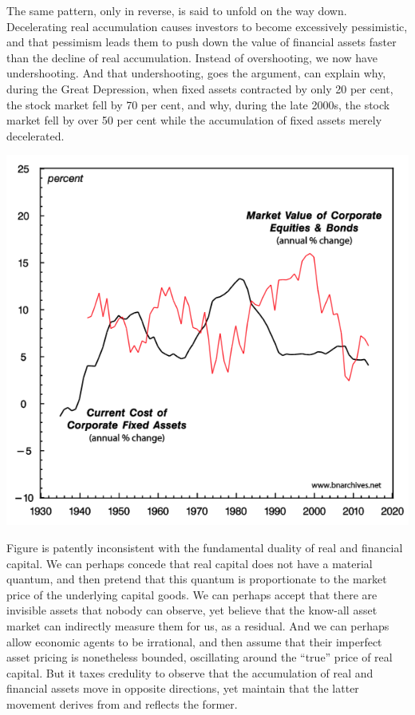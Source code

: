 \documentclass[
]{book}
\begin{document}
The same pattern, only in reverse, is said to unfold on the way down. Decelerating real accumulation causes investors to become excessively pessimistic, and that pessimism leads them to push down the value of financial assets faster than the decline of real accumulation. Instead of overshooting, we now have undershooting. And that undershooting, goes the argument, can explain why, during the Great Depression, when fixed assets contracted by only 20 per cent, the stock market fell by 70 per cent, and why, during the late 2000s, the stock market fell by over 50 per cent while the accumulation of fixed assets merely decelerated.

\includegraphics{fig/Capital_Accumulation_US.png}

Figure is patently inconsistent with the fundamental duality of real and financial capital. We can perhaps concede that real capital does not have a material quantum, and then pretend that this quantum is proportionate to the market price of the underlying capital goods. We can perhaps accept that there are invisible assets that nobody can observe, yet believe that the know-all asset market can indirectly measure them for us, as a residual. And we can perhaps allow economic agents to be irrational, and then assume that their imperfect asset pricing is nonetheless bounded, oscillating around the ``true'' price of real capital. But it taxes credulity to observe that the accumulation of real and financial assets move in opposite directions, yet maintain that the latter movement derives from and reflects the former.
\end{document}
